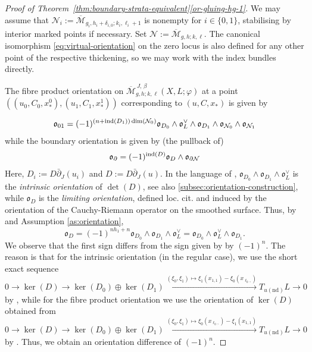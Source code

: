 \documentclass[11pt,psamsfonts, oneside, reqno]{amsart}
\newcommand{\xra}{\xrightarrow}
\newcommand{\dul}{^\vee}
\newcommand{\Mbar}{\overline{\mathcal M}}
\newcommand{\delbar}{\bar\partial}
\newcommand{\del}{\partial}
\newcommand{\cN}{\mathcal{N}}
\newcommand{\fo}{\mathfrak{o}}
\newcommand{\ind}{\normalfont\text{ind}}
\theoremstyle{definition}
\theoremstyle{remark}
\numberwithin{equation}{section}
\begin{document}
	\begin{proof}[Proof of Theorem~\ref{thm:boundary-strata-equivalent}\eqref{or-gluing-hg-1}]
		We may assume that $\cN_i := \Mbar_{g_i,h_i+\delta_{i,0};k_i,\ell_i+1}$ is nonempty for $i \in \{0,1\}$, stabilising by interior marked points if necessary. Set $\cN:= \Mbar_{g,h;k,\ell}$. The canonical isomorphism \eqref{eq:virtual-orientation} on the zero locus is also defined for any other point of the respective thickening, so we may work with the index bundles directly.\par The fibre product orientation on $\Mbar_{g,h;k,\ell}^{\,J,\,\beta}(X,L;\varphi)$ at a point $((u_0,C_0,x^0_*),(u_1,C_1,x^1_*))$ corresponding to $(u,C,x_*)$ is given by 
		
  \begin{align*}
  	\fo_{01} = (-1)^{(n + \ind(D_1))\dim(\cN_0)} \fo_{D_0}\wedge \fo_L\dul \wedge \fo_{D_1} \wedge \fo_{\cN_0}\wedge \fo_{\cN_1}
  \end{align*}
	while the boundary orientation is given by (the pullback of)
	 \begin{align*}
		\fo_{\del} = (-1)^{\ind(D)} \fo_{D}\wedge \fo_{\del\cN}
	\end{align*}
	Here, $D_i := D\delbar_J(u_i)$ and $D := D\delbar_J(u)$. In the language of \cite{CZ24}, $\fo_{D_0}\wedge \fo_{D_1}\wedge \fo_L\dul$ is the \emph{intrinsic orientation} of $\det(D)$, see also \textsection\ref{subsec:orientation-construction},  while $\fo_{D}$ is the \emph{limiting orientation}, defined loc. cit. and induced by the orientation of the Cauchy-Riemann operator on the smoothed surface. Thus, by \cite[CROrient~7H3(a)]{CZ24} and Assumption \ref{as:orientation},
	\begin{equation}\label{eq:vertical-orientations-h3} \fo_D = (-1)^{n h_1+n}\fo_{D_0} \wedge \fo_{D_1}\wedge \fo_L\dul = \fo_{D_0}\wedge \fo_L\dul \wedge \fo_{D_1} .\end{equation}
	We observe that the first sign differs from the sign given by \cite[CROrient~7H3(a)]{CZ24} by $(-1)^n$. The reason is that for the intrinsic orientation (in the regular case), we use the short exact sequence 
	$$0 \to \ker(D)\to \ker(D_0)\oplus \ker(D_1)\xra{(\xi_0,\xi_1)\mapsto \xi_1(x_{1,1})-\xi_0(x_{\ell_0,})} T_{u(\text{nd})}L \to 0$$\noindent
	by \cite[Equation~(7.39)]{CZ24}, while for the fibre product orientation we use the orientation of $\ker(D)$ obtained from  
	$$0 \to \ker(D)\to \ker(D_0)\oplus \ker(D_1)\xra{(\xi_0,\xi_1)\mapsto \xi_0(x_{\ell_0,})-\xi_1(x_{1,1})} T_{u(\text{nd})}L \to 0$$\noindent
	by \cite[Convention~7.2(b)]{Joy}. Thus, we obtain an orientation difference of $(-1)^{n}$.

\end{proof}
\end{document}
